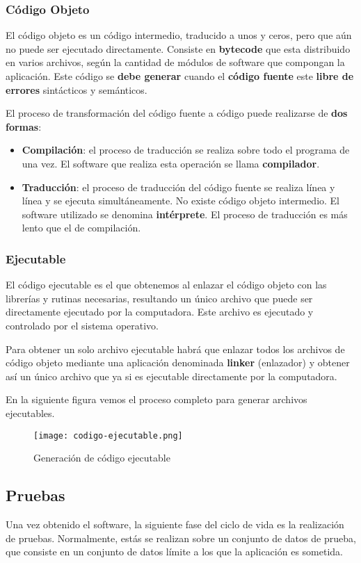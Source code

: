 \subsubsection{Código Objeto}
El código objeto es un código intermedio, traducido a unos y ceros, pero que aún no puede ser ejecutado directamente. Consiste en \textbf{bytecode} que esta distribuido en varios archivos, según la cantidad de módulos de software que compongan la aplicación. Este código se \textbf{debe generar} cuando el \textbf{código fuente} este \textbf{libre de errores} sintácticos y semánticos.

El proceso de transformación del código fuente a código puede realizarse de \textbf{dos formas}:
\begin{itemize}
    \item \textbf{Compilación}: el proceso de traducción se realiza sobre todo el programa de una vez. El software que realiza esta operación se llama \textbf{compilador}.
    \item \textbf{Traducción}: el proceso de traducción del código fuente se realiza línea y línea y se ejecuta simultáneamente. No existe código objeto intermedio. El software utilizado se denomina  \textbf{intérprete}. El proceso de traducción es más lento que el de compilación.
\end{itemize}

\subsubsection{Ejecutable}
El código ejecutable es el que obtenemos al enlazar el código objeto con las librerías y rutinas necesarias, resultando un único archivo que puede ser directamente ejecutado por la computadora. Este archivo es ejecutado y controlado por el sistema operativo.

Para obtener un solo archivo ejecutable habrá que enlazar todos los archivos de código objeto mediante una aplicación denominada \textbf{linker} (enlazador) y obtener así un único archivo que ya si es ejecutable directamente por la computadora.

En la siguiente figura vemos el proceso completo para generar archivos ejecutables.

\begin{figure}[ht]
    \centering
    \texttt{[image: codigo-ejecutable.png]}
    \caption{Generación de código ejecutable}
\end{figure}

\subsection{Pruebas}
Una vez obtenido el software, la siguiente fase del ciclo de vida es la realización de pruebas. Normalmente, estás se realizan sobre un conjunto de datos de prueba, que consiste en un conjunto de datos límite  a los que la aplicación es sometida.

